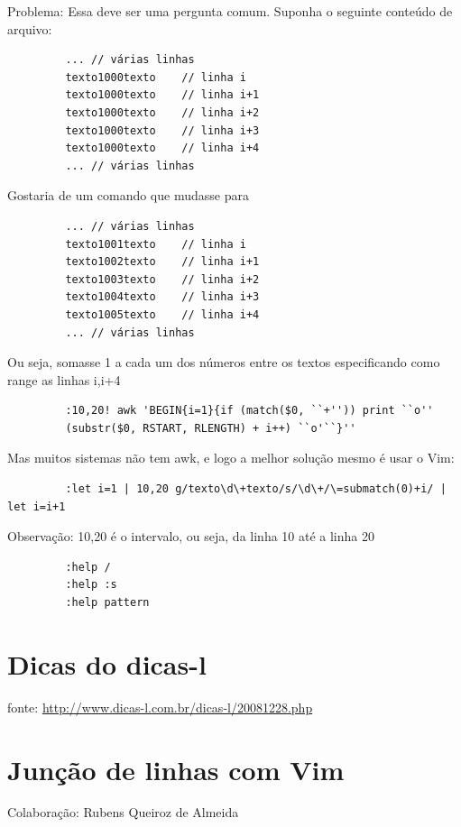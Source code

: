 \documentclass[10pt,a4paper,openany]{book}
\begin{document}
 Problema:
 Essa deve ser uma pergunta comum.
 Suponha o seguinte conteúdo de arquivo:

\begin{verbatim}
		 ... // várias linhas
		 texto1000texto    // linha i
		 texto1000texto    // linha i+1
		 texto1000texto    // linha i+2
		 texto1000texto    // linha i+3
		 texto1000texto    // linha i+4
		 ... // várias linhas
\end{verbatim}

Gostaria de um comando que mudasse para

\begin{verbatim}
		 ... // várias linhas
		 texto1001texto    // linha i
		 texto1002texto    // linha i+1
		 texto1003texto    // linha i+2
		 texto1004texto    // linha i+3
		 texto1005texto    // linha i+4
		 ... // várias linhas
\end{verbatim}

 Ou seja, somasse 1 a cada um dos números entre os textos
 especificando como range as linhas i,i+4

\begin{verbatim}
		 :10,20! awk 'BEGIN{i=1}{if (match($0, ``+'')) print ``o''
		 (substr($0, RSTART, RLENGTH) + i++) ``o'``}''
\end{verbatim}

 Mas muitos sistemas não tem awk, e logo a melhor solução mesmo é usar o Vim:

\begin{verbatim}
		 :let i=1 | 10,20 g/texto\d\+texto/s/\d\+/\=submatch(0)+i/ | let i=i+1
\end{verbatim}

Observação: 10,20 é o intervalo, ou seja, da linha 10 até a linha 20

\begin{verbatim}
		 :help /
		 :help :s
		 :help pattern
\end{verbatim}

\section{Dicas do dicas-l}

fonte: \url{http://www.dicas-l.com.br/dicas-l/20081228.php}

\section{Junção de linhas com Vim}
\label{Junção de linhas com Vim}
Colaboração: Rubens Queiroz de Almeida
\end{document}
